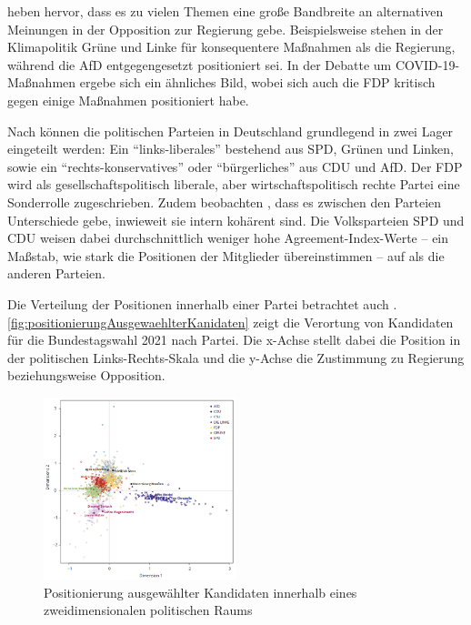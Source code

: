 \textcite{engler_wettbewerb_2022} heben hervor, dass es zu vielen Themen eine große Bandbreite an alternativen Meinungen in der Opposition zur Regierung gebe. Beispielsweise stehen in der Klimapolitik Grüne und Linke für konsequentere Maßnahmen als die Regierung, während die \ac{AfD} entgegengesetzt positioniert sei. In der Debatte um \ac{COVID-19}-Maßnahmen ergebe sich ein ähnliches Bild, wobei sich auch die \ac{FDP} kritisch gegen einige Maßnahmen positioniert habe.

Nach \textcite{thomeczek_politische_2019} können die politischen Parteien in Deutschland grundlegend in zwei Lager eingeteilt werden: Ein \enquote{links-liberales} bestehend aus \ac{SPD}, Grünen und Linken, sowie ein \enquote{rechts-konservatives} oder \enquote{bürgerliches} aus \ac{CDU} und \ac{AfD}. Der \ac{FDP} wird als gesellschaftspolitisch liberale, aber wirtschaftspolitisch rechte Partei eine Sonderrolle zugeschrieben. Zudem beobachten \textcite{thomeczek_politische_2019}, dass es zwischen den Parteien Unterschiede gebe, inwieweit sie intern kohärent sind. Die Volksparteien \ac{SPD} und \ac{CDU} weisen dabei durchschnittlich weniger hohe Agreement-Index-Werte -- ein Maßstab, wie stark die Positionen der Mitglieder übereinstimmen -- auf als die anderen Parteien.

Die Verteilung der Positionen innerhalb einer Partei betrachtet auch \textcite{saltzer_bundestagswahl_2022}. \autoref{fig:positionierungAusgewaehlterKanidaten} zeigt die Verortung von Kandidaten für die Bundestagswahl 2021 nach Partei. Die x-Achse stellt dabei die Position in der politischen Links-Rechts-Skala und die y-Achse die Zustimmung zu Regierung beziehungsweise Opposition.

\begin{figure}[H]
    \centering
    \includegraphics[width=0.5\textwidth]{data/images/positionierung_ausgewaehlter_kandidaten.png}
    \caption[Positionierung ausgewählter Kandidaten \autocite{saltzer_bundestagswahl_2022}]{Positionierung ausgewählter Kandidaten innerhalb eines zweidimensionalen politischen Raums \autocite{saltzer_bundestagswahl_2022}} \label{fig:positionierungAusgewaehlterKanidaten}
\end{figure}

